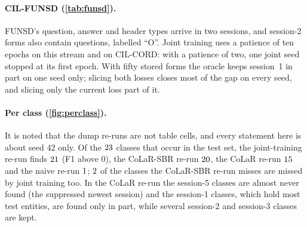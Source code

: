 \begin{table}[t]
\centering\scriptsize
\setlength{\tabcolsep}{2.5pt}
\caption{\textbf{CIL-FUNSD} (clean protocol, LayoutLMv3, $10$ stored forms per session; mean $\pm$ s.d., three seeds). $R[2,1]$: session-1 F1 after session~2, range over seeds. $^{r}$Oracle: every stored form relabelled before each session. Bold: best of each column, Joint training and the true-label controls aside; underlined: CoLaR-SBR when another row is best.}
\label{tab:funsd}
\resizebox{\linewidth}{!}{}
\end{table}

\paragraph{CIL-FUNSD (\cref{tab:funsd}).} FUNSD's question, answer and header types arrive in two sessions, and session-2 forms also contain questions, labelled ``O''. Joint training uses a patience of ten epochs on this stream and on CIL-CORD: with a patience of two, one joint seed stopped at its first epoch. With fifty stored forms the oracle keeps session~1 in part on one seed only; slicing both losses closes most of the gap on every seed, and slicing only the current loss part of it.

\paragraph{Per class (\cref{fig:perclass}).} It is noted that the dump re-runs are not table cells, and every statement here is about seed 42 only. Of the $23$ classes that occur in the test set, the joint-training re-run finds $21$ (F1 above $0$), the CoLaR-SBR re-run $20$, the CoLaR re-run $15$ and the naive re-run $1$; $2$ of the classes the CoLaR-SBR re-run misses are missed by joint training too. In the CoLaR re-run the session-5 classes are almost never found (the suppressed newest session) and the session-1 classes, which hold most test entities, are found only in part, while several session-2 and session-3 classes are kept.

\begin{table}[t]
\centering\scriptsize
\setlength{\tabcolsep}{2pt}
\caption{\textbf{Component ablations on CIL-CORD}, the runs of  (clean protocol, LayoutLMv3, mean $\pm$ s.d. over three seeds). Ticks: memory (Mem.; latent unless marked raw), blocked readout (Blk.), per-session deltas ($\Delta$), true labels (True). All rows but naive, joint and the raw memory freeze at least the embeddings and layers $1..4$ after session~1. MB: bytes kept across sessions (); SBR-Recall's deltas at two bytes per parameter, a reporting choice ($\nMemRecallFpMB$ as trained in fp32). $^{r}$Stored documents given their true labels (H1): the older ones at each boundary, or all of them before each session (pre-session). Bold: best of each column, Joint training and the true-label controls aside.}
\label{tab:ablation}

\end{table}

